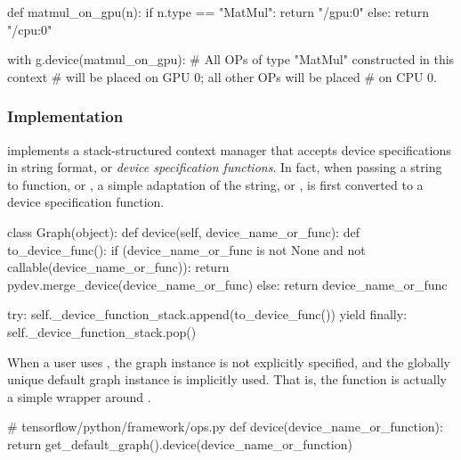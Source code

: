 \begin{content}
\begin{leftbar}
\begin{python}
def matmul_on_gpu(n):
 if n.type == "MatMul":
   return "/gpu:0"
 else:
   return "/cpu:0"

with g.device(matmul_on_gpu):
  # All OPs of type "MatMul" constructed in this context
  # will be placed on GPU 0; all other OPs will be placed
  # on CPU 0.
\end{python}
\end{leftbar}


\subsubsection{Implementation}

 implements a stack-structured context manager that accepts device specifications in string format, or \emph{device specification functions}. In fact, when passing a string to  function, or , a simple adaptation of the string, or , is first converted to a device specification function.

\begin{leftbar}
\begin{python}
class Graph(object):
  def device(self, device_name_or_func):
    def to_device_func():
      if (device_name_or_func is not None
          and not callable(device_name_or_func)):
        return pydev.merge_device(device_name_or_func)
      else:
        return device_name_or_func

    try:
      self._device_function_stack.append(to_device_func())
      yield
    finally:
      self._device_function_stack.pop()
\end{python}
\end{leftbar}

When a user uses , the graph instance is not explicitly specified, and the globally unique default graph instance is implicitly used. That is, the  function is actually a simple wrapper around .

\begin{leftbar}
\begin{python}
# tensorflow/python/framework/ops.py
def device(device_name_or_function):
  return get_default_graph().device(device_name_or_function)
\end{python}
\end{leftbar}



\end{content}
